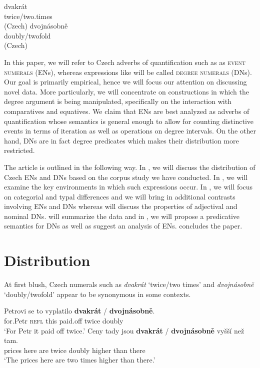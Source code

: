 \documentclass[output=paper,modfonts,hidelinks,newtxmath
\ChapterDOI{10.5281/zenodo.2545513}
]{langscibook}
\begin{document}
\ea\label{twice-double-czech} \ea \gll dvakrát\label{dvakrat-czech}\\ 
          twice/two.times\\\hfill(Czech)
     \ex \gll dvojnásobně\label{dvojnasobne-czech}\\
          doubly/twofold\\\hfill(Czech)
          \z
\z

\noindent In this paper, we will refer to Czech adverbs of quantification such as  as \textsc{event numerals} (ENs), whereas expressions like  will be called \textsc{degree numerals} (DNs). Our goal is primarily empirical, hence we will focus our attention on discussing novel data. More particularly, we will concentrate on constructions in which the degree argument is being manipulated, specifically on the interaction with comparatives and equatives. We claim that ENs are best analyzed as adverbs of quantification whose semantics is general enough to allow for counting distinctive events in terms of iteration as well as operations on degree intervals. On the other hand, DNs are in fact degree predicates which makes their distribution more restricted.

\largerpage[2]
The article is outlined in the following way. In , we will discuss the distribution of Czech ENs and DNs based on the corpus study we have conducted. In , we will examine the key environments in which such expressions occur. In , we will focus on categorial and typal differences and we will bring in additional contrasts involving ENs and DNs whereas  will discuss the properties of adjectival and nominal DNs.  will summarize the data and in , we will propose a predicative semantics for DNs as well as suggest an analysis of ENs.  concludes the paper.

\section{Distribution}\label{distribution}

At first blush, Czech numerals such as \textit{dvakrát} `twice/two times' and \textit{dvojnásobně} `doubly/twofold' appear to be synonymous in some contexts.

\ea \ea \gll Petrovi se to vyplatilo \textbf{dvakrát} / \textbf{dvojnásobně}.\\
for.Petr \textsc{refl} this paid.off twice {} doubly\\
\glt `For Petr it paid off twice.'
\ex \gll Ceny tady jsou \textbf{dvakrát} / \textbf{dvojnásobně} vyšší než tam.\\
prices here are twice {} doubly higher than there\\
\glt `The prices here are two times higher than there.'
\z
\z
\end{document}

